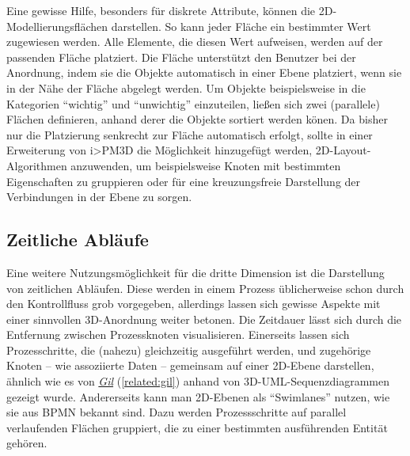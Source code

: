 \documentclass[a4paper,10pt]{sphinxmanual}
\begin{document}
Eine gewisse Hilfe, besonders für diskrete Attribute, können die 2D-Modellierungsflächen darstellen. So kann jeder Fläche ein bestimmter Wert zugewiesen werden.
Alle Elemente, die diesen Wert aufweisen, werden auf der passenden Fläche platziert.
Die Fläche unterstützt den Benutzer bei der Anordnung, indem sie die Objekte automatisch in einer Ebene platziert, wenn sie in der Nähe der Fläche abgelegt werden.
Um Objekte beispielsweise in die Kategorien "`wichtig"' und "`unwichtig"' einzuteilen, ließen sich zwei (parallele) Flächen definieren, anhand derer die Objekte sortiert werden könen.
Da bisher nur die Platzierung senkrecht zur Fläche automatisch erfolgt, sollte in einer Erweiterung von i\textgreater{}PM3D die Möglichkeit hinzugefügt werden, 2D-Layout-Algorithmen anzuwenden, um beispielsweise Knoten mit bestimmten Eigenschaften zu gruppieren oder für eine kreuzungsfreie Darstellung der Verbindungen in der Ebene zu sorgen.


\subsection{Zeitliche Abläufe}
\label{visualisierung:zeitliche-ablaufe}
Eine weitere Nutzungsmöglichkeit für die dritte Dimension ist die Darstellung von zeitlichen Abläufen.
Diese werden in einem Prozess üblicherweise schon durch den Kontrollfluss grob vorgegeben, allerdings lassen sich gewisse Aspekte mit einer sinnvollen 3D-Anordnung weiter betonen.
Die Zeitdauer lässt sich durch die Entfernung zwischen Prozessknoten visualisieren.
Einerseits lassen sich Prozesschritte, die (nahezu) gleichzeitig ausgeführt werden, und zugehörige Knoten – wie assoziierte Daten – gemeinsam auf einer 2D-Ebene darstellen, ähnlich wie es von {\hyperref[related:gil]{\emph{Gil}}} (\autoref*{related:gil}) anhand von 3D-UML-Sequenzdiagrammen gezeigt wurde.
Andererseits kann man 2D-Ebenen als "`Swimlanes"' nutzen, wie sie aus BPMN bekannt sind.
Dazu werden Prozessschritte auf parallel verlaufenden Flächen gruppiert, die zu einer bestimmten ausführenden Entität gehören.
\end{document}
